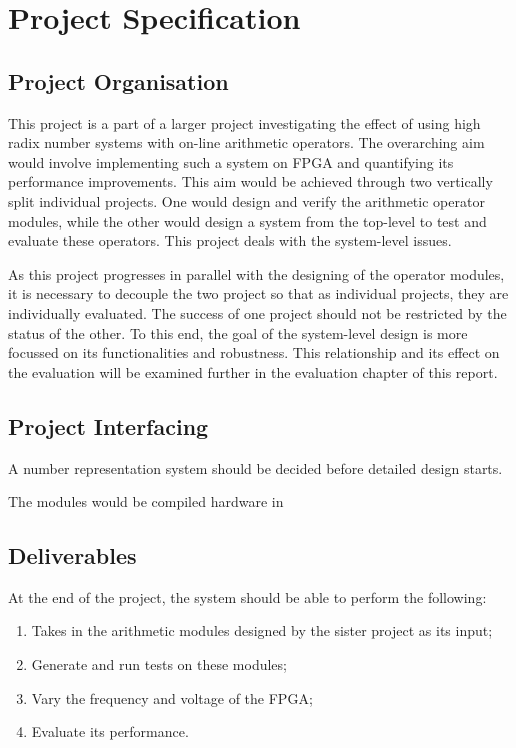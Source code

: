 \section{Project Specification}

\subsection{Project Organisation}
This project is a part of a larger project investigating the effect of using
high radix number systems with on-line arithmetic operators.
The overarching aim would involve implementing such a system on FPGA and
quantifying its performance improvements.
This aim would be achieved through two vertically split individual projects.
One would design and verify the arithmetic operator modules,
while the other would design a system from the top-level to test and
evaluate these operators.
This project deals with the system-level issues.

As this project progresses in parallel with the designing of the operator
modules, it is necessary to decouple the two project so that as individual
projects, they are individually evaluated.
The success of one project should not be restricted by the status of the other.
To this end, the goal of the system-level design is more focussed on its
functionalities and robustness.
This relationship and its effect on the evaluation will be examined further in
the evaluation chapter of this report.

\subsection{Project Interfacing}
A number representation system should be decided before detailed design starts.

The modules would be compiled hardware in 

\subsection{Deliverables}
At the end of the project, the system should be able to perform the following:
\begin{enumerate}
  \item Takes in the arithmetic modules designed by the sister project as its
        input;
  \item Generate and run tests on these modules;
  \item Vary the frequency and voltage of the FPGA;
  \item Evaluate its performance.
\end{enumerate}

